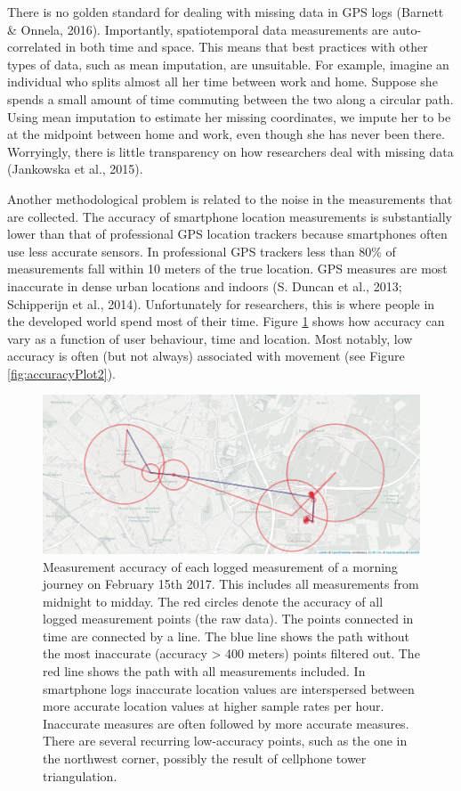 \documentclass[man]{apa6}
\theoremstyle{definition}
\theoremstyle{definition}
\theoremstyle{definition}
\theoremstyle{remark}
\begin{document}
There is no golden standard for dealing with missing data in GPS logs
(Barnett \& Onnela, 2016). Importantly, spatiotemporal data measurements
are auto-correlated in both time and space. This means that best
practices with other types of data, such as mean imputation, are
unsuitable. For example, imagine an individual who splits almost all her
time between work and home. Suppose she spends a small amount of time
commuting between the two along a circular path. Using mean imputation
to estimate her missing coordinates, we impute her to be at the midpoint
between home and work, even though she has never been there. Worryingly,
there is little transparency on how researchers deal with missing data
(Jankowska et al., 2015).

Another methodological problem is related to the noise in the
measurements that are collected. The accuracy of smartphone location
measurements is substantially lower than that of professional GPS
location trackers because smartphones often use less accurate sensors.
In professional GPS trackers less than 80\% of measurements fall within
10 meters of the true location. GPS measures are most inaccurate in
dense urban locations and indoors (S. Duncan et al., 2013; Schipperijn
et al., 2014). Unfortunately for researchers, this is where people in
the developed world spend most of their time. Figure
\ref{fig:accuracyPlot} shows how accuracy can vary as a function of user
behaviour, time and location. Most notably, low accuracy is often (but
not always) associated with movement (see Figure
\ref{fig:accuracyPlot2}).

\begin{figure}
\includegraphics[width=1\linewidth]{img/journeyTillMiddayBoaz} \caption{Measurement accuracy of each logged measurement of a morning journey on February 15th 2017. This includes all measurements from midnight to midday. The red circles denote the accuracy of all logged measurement points (the raw data). The points connected in time are connected by a line. The blue line shows the path without the most inaccurate (accuracy > 400 meters) points filtered out. The red line shows the path with all measurements included. In smartphone logs inaccurate location values are interspersed between more accurate location values at higher sample rates per hour. Inaccurate measures are often followed by more accurate measures. There are several recurring low-accuracy points, such as the one in the northwest corner, possibly the result of cellphone tower triangulation.}\label{fig:accuracyPlot}
\end{figure}
\end{document}
